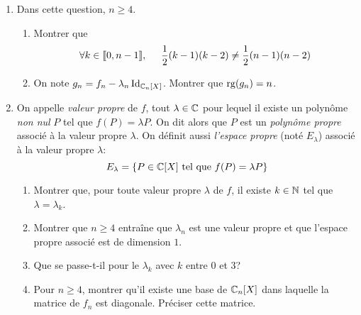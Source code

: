 \begin{enumerate}
\item Dans cette question, $n\geq 4$.
\begin{enumerate}
  \item Montrer que
\begin{displaymath}
\forall k \in \llbracket 0, n-1 \rrbracket,\hspace{0.5cm} \frac{1}{2}(k-1)(k-2) \neq \frac{1}{2}(n-1)(n-2)  
\end{displaymath}
  \item On note $g_n = f_n - \lambda_n \operatorname{Id}_{\mathbb{C}_n[X]}$. Montrer que $\operatorname{rg}(g_n)=n$.
\end{enumerate}
  \item On appelle \emph{valeur propre} de $f$, tout $\lambda \in \mathbb{C}$ pour lequel il existe un polynôme \emph{non nul} $P$ tel que $f(P)=\lambda P$. On dit alors que $P$ est un \emph{polynôme propre} associé à la valeur propre $\lambda$. On définit aussi \emph{l'espace propre} (noté $E_\lambda$) associé à la valeur propre $\lambda$:
\begin{displaymath}
  E_\lambda = \left\lbrace P\in \mathbb{C}[X] \text{ tel que } f(P)=\lambda P \right\rbrace 
\end{displaymath}
\begin{enumerate}
  \item Montrer que, pour toute valeur propre $\lambda$ de $f$, il existe $k\in \mathbb{N}$ tel que $\lambda = \lambda_k$.
  \item Montrer que $n\geq 4$ entraîne que $\lambda_n$ est une valeur propre et que l'espace propre associé est de dimension $1$.
  \item Que se passe-t-il pour le $\lambda_k$ avec $k$ entre $0$ et $3$?
  \item Pour $n\geq 4$, montrer qu'il existe une base de $\mathbb{C}_n[X]$ dans laquelle la matrice de $f_n$ est diagonale. Préciser cette matrice.
\end{enumerate}

\end{enumerate}


